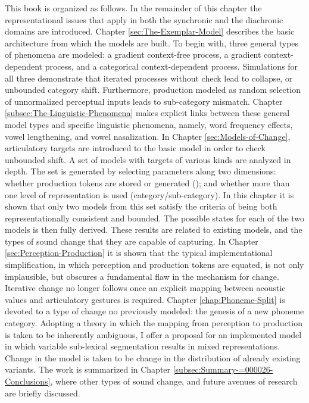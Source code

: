 This book is organized as follows. In the remainder of this chapter
the representational issues that apply in both the synchronic and
the diachronic domains are introduced. Chapter \ref{sec:The-Exemplar-Model}
describes the basic architecture from which the models are built.
To begin with, three general types of phenomena are modeled: a gradient
context-free process, a gradient context-dependent process, and a
categorical context-dependent process. Simulations for all three demonstrate
that iterated processes without check lead to collapse, or unbounded
category shift. Furthermore, production modeled as random selection
of unnormalized perceptual inputs leads to sub-category mismatch.
Chapter \ref{subsec:The-Linguistic-Phenomena} makes explicit links
between these general model types and specific linguistic phenomena,
namely, word frequency effects, vowel lengthening, and vowel nasalization.
In Chapter \ref{sec:Models-of-Change}, articulatory targets are introduced
to the basic model in order to check unbounded shift. A set of models
with targets of various kinds are analyzed in depth. The set is generated
by selecting parameters along two dimensions: whether production tokens
are stored or generated (); and whether more than
one level of representation is used (category/sub-category). In this
chapter it is shown that only two models from this set satisfy the
criteria of being both representationally consistent and bounded.
The possible states for each of the two models is then fully derived.
These results are related to existing models, and the types of sound
change that they are capable of capturing. In Chapter \ref{sec:Perception-Production}
it is shown that the typical implementational simplification, in which
perception and production tokens are equated, is not only implausible,
but obscures a fundamental flaw in the mechanism for change. Iterative
change no longer follows once an explicit mapping between acoustic
values and articulatory gestures is required. Chapter \ref{chap:Phoneme-Split}
is devoted to a type of change no previously modeled: the genesis
of a new phoneme category. Adopting a theory in which the mapping
from perception to production is taken to be inherently ambiguous,
I offer a proposal for an implemented model in which variable sub-lexical
segmentation results in mixed representations. Change in the model
is taken to be change in the distribution of already existing variants.
The work is summarized in Chapter \ref{subsec:Summary-=000026-Conclusions},
where other types of sound change, and future avenues of research
are briefly discussed. 

